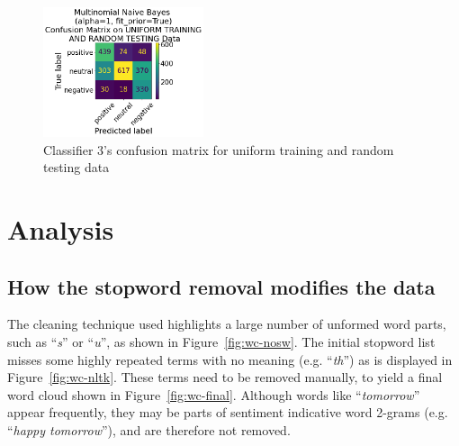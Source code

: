 \documentclass[11pt]{article}
\begin{document}
\begin{figure}[!h]
	\centering
	\includegraphics[width = 0.42\textwidth]{cf/MultinomialNaiveBayesalpha1fit_priorTrue-UniformTrainingandRandomTesting-confusion-matrix.png}
	\caption{Classifier 3's confusion matrix for uniform training and random testing data}
	\label{fig:cf-3rd-ur}
\end{figure} 



\section{Analysis}


\subsection{How the stopword removal modifies the data}
The cleaning technique used highlights a large number of unformed word parts, such as ``\emph{s}'' or ``\emph{u}'', as shown in Figure~\ref{fig:wc-nosw}.
The initial stopword list misses some highly repeated terms with no meaning (e.g. ``\emph{th}'') as is displayed in Figure~\ref{fig:wc-nltk}. 
These terms need to be removed manually, to yield a final word cloud shown in Figure~\ref{fig:wc-final}.
Although words like ``\emph{tomorrow}'' appear frequently, they may be parts of sentiment indicative word 2-grams (e.g. ``\emph{happy tomorrow}''), and are therefore not removed.
\end{document}
